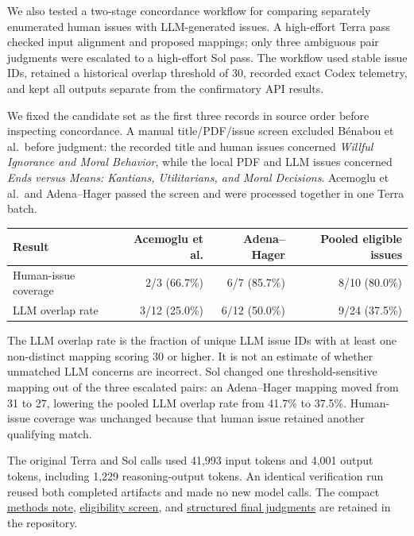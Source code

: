 \documentclass[
  11pt,
  letterpaper,
]{article}
\begin{document}
We also tested a two-stage concordance workflow for comparing separately
enumerated human issues with LLM-generated issues. A high-effort Terra
pass checked input alignment and proposed mappings; only three ambiguous
pair judgments were escalated to a high-effort Sol pass. The workflow
used stable issue IDs, retained a historical overlap threshold of 30,
recorded exact Codex telemetry, and kept all outputs separate from the
confirmatory API results.

We fixed the candidate set as the first three records in source order
before inspecting concordance. A manual title/PDF/issue screen excluded
Bénabou et al.~before judgment: the recorded title and human issues
concerned \emph{Willful Ignorance and Moral Behavior}, while the local
PDF and LLM issues concerned \emph{Ends versus Means: Kantians,
Utilitarians, and Moral Decisions}. Acemoglu et al.~and Adena--Hager
passed the screen and were processed together in one Terra batch.

\begin{longtable}[]{@{}lrrr@{}}
\toprule\noalign{}
Result & Acemoglu et al. & Adena--Hager & Pooled eligible issues \\
\midrule\noalign{}
\endhead
\bottomrule\noalign{}
\endlastfoot
Human-issue coverage & 2/3 (66.7\%) & 6/7 (85.7\%) & 8/10 (80.0\%) \\
LLM overlap rate & 3/12 (25.0\%) & 6/12 (50.0\%) & 9/24 (37.5\%) \\
\end{longtable}

The LLM overlap rate is the fraction of unique LLM issue IDs with at
least one non-distinct mapping scoring 30 or higher. It is not an
estimate of whether unmatched LLM concerns are incorrect. Sol changed
one threshold-sensitive mapping out of the three escalated pairs: an
Adena--Hager mapping moved from 31 to 27, lowering the pooled LLM
overlap rate from 41.7\% to 37.5\%. Human-issue coverage was unchanged
because that human issue retained another qualifying match.

The original Terra and Sol calls used 41,993 input tokens and 4,001
output tokens, including 1,229 reasoning-output tokens. An identical
verification run reused both completed artifacts and made no new model
calls. The compact
\href{https://github.com/valentinklotzbuecher/llm-uj-research-eval/blob/working-paper/docs/concordance_three_candidate_methods_note_jul2026.md}{methods
note},
\href{https://github.com/valentinklotzbuecher/llm-uj-research-eval/blob/working-paper/results/concordance_codex_three_candidate_screened_batch_jul2026/eligibility_screen.md}{eligibility
screen}, and
\href{https://github.com/valentinklotzbuecher/llm-uj-research-eval/blob/working-paper/results/concordance_codex_three_candidate_screened_batch_jul2026/concordance_results.json}{structured
final judgments} are retained in the repository.
\end{document}
